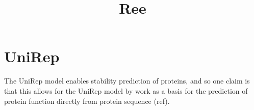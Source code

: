 \documentclass[a4paper,11pt]{report}
\title{Ree}
\date{}
\begin{document}


\section*{UniRep}
The UniRep model enables stability prediction of proteins, and so one claim is that this allows for the UniRep model by work as a basis for the prediction of protein function directly from protein sequence (ref).

\clearpage
\printbibliography[title={References}]
\end{document}
